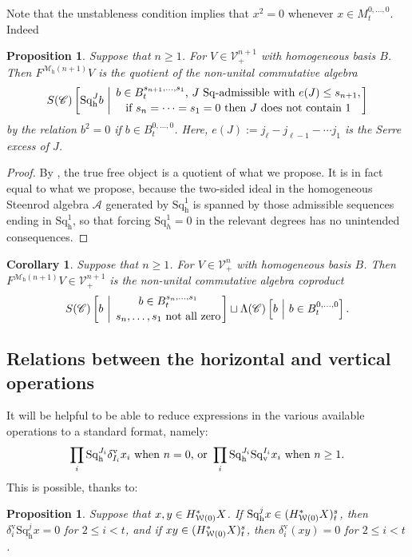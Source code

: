 \documentclass[11pt]{amsart} \renewcommand{\baselinestretch}{1.2}
\theoremstyle{plain}
\newtheorem{prop}[thm]{Proposition}
\newtheorem{cor}[thm]{Corollary}
\numberwithin{equation}{section} %
\theoremstyle{plain}
\newtheorem{prop}[thm]{Proposition}
\newtheorem{cor}[thm]{Corollary}
\numberwithin{equation}{chapter} %
\newcommand{\scrC}{\mathscr{C}}
\newcommand{\calA}{\mathcal{A}}
\newcommand{\calV}{\mathcal{V}}
\newcommand{\calw}{\mathcal{W}}
\newcommand{\calMh}{\mathcal{M}\dhor}
\newcommand{\citeBOX}[2][]{\cite[\mbox{#1}]{#2}}
\newcommand{\CommOperad}{{\scrC}}
\newcommand{\vect}[2]{\calV^{#1}_{#2}}
\newcommand{\excess}{e}
\newcommand{\Sq}{\mathrm{Sq}}
\newcommand{\LieSteen}{\calA}
\newcommand{\uver}{^\mathrm{v}}
\newcommand{\dver}{_\mathrm{v}}
\newcommand{\dhor}{_\mathrm{h}}
\newcommand{\Sqh}{\mathrm{Sq}\dhor}
\newcommand{\Sqv}{\mathrm{Sq}\dver}
\newcommand{\deltav}{\delta\uver}
\newcommand{\SubsectionOrSection}[1]{\subsection{#1}}
\begin{document}
\begin{Cohomology Operations for W and U}
Note that the unstableness condition implies that $x^2=0$ whenever $x\in M_t^{0,\ldots,0}$. Indeed
\begin{prop}
\label{basis of free horizontal operations algebra}
Suppose that $n\geq1$. For $V\in\vect{n+1}{+}$ with homogeneous basis $B$. Then $F^{\calMh(n+1)}V$ is the quotient of the non-unital commutative algebra
\[S(\CommOperad) \left[\Sqh^Jb\ \middle|\ \genfrac{}{}{0pt}{}{b\in B^{s_{n+1},\ldots,s_1}_t\textup{, $J$ $\Sq$-admissible with }\excess(J)\leq s_{n+1},}{\textup{if }s_{n}=\cdots=s_1=0\textup{ then $J$ does not contain 1}}\right]\]
by the relation $b^2=0$ if $b\in B_t^{0,\ldots,0}$. Here, $e(J):=j_\ell-j_{\ell-1}-\cdots j_1$ is the Serre excess of $J$.
\end{prop}
\begin{proof}
By \citeBOX[6.1]{PriddySimplicialLie.pdf}, the true free object is a quotient of what we propose. It is in fact equal to what we propose, because the two-sided ideal in the homogeneous Steenrod algebra $\LieSteen$ generated by $\Sqh^1$ is spanned by those admissible sequences ending in $\Sqh^1$, so that forcing $\Sq^1_h=0$ in the relevant degrees has no unintended consequences. %
\end{proof}
\begin{cor}
\label{basis of free horizontal operations algebra restricted}
Suppose that $n\geq1$. For $V\in\vect{n}{+}$ with homogeneous basis $B$. Then $F^{\calMh(n+1)}V\in\vect{n+1}{+}$ is the non-unital commutative algebra coproduct
\[S(\CommOperad) \left[b\ \middle|\ \genfrac{}{}{0pt}{}{b\in B^{s_{n},\ldots,s_1}_t}{s_{n},\ldots,s_1\textup{ not all zero}}\right]\sqcup\Lambda(\CommOperad) \left[b\ \middle|\ b\in B^{0,\ldots,0}_t\right].\]
\end{cor}
\SubsectionOrSection{Relations between the horizontal and vertical operations}
\label{Relations between the horizontal and vertical operations}
It will be helpful to be able to reduce %
expressions in the various available operations to a standard format, namely:
\[\prod_i \Sqh^{J_{i}}\deltav_{I_{i}}x_i\textup{ when $n=0$, or }\prod_i \Sqh^{J_{i}}\Sqv^{I_{i}}x_i\textup{ when $n\geq1$}.\]
This is possible, thanks to:
\begin{prop}
\label{rearrange horiz and vert ops}
Suppose that $x,y\in H^*_{\smash{\calw(0)}}X$. If $\Sqh^jx\in (H^*_{\smash{\calw(0)}}X)^{s}_{t}$, then $\deltav_i\Sqh^{j}x=0$ for  $2\leq i<t$, and if $xy\in (H^*_{\smash{\calw(0)}}X)^{s}_{t}$, then $\deltav_i(xy)=0$ for  $2\leq i<t$.


\end{prop}
\end{Cohomology Operations for W and U}
\end{document}
